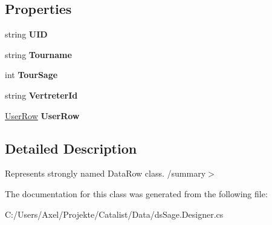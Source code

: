 \subsection*{Properties}
\begin{DoxyCompactItemize}
\item 
string {\bfseries U\+ID}\hypertarget{class_products_1_1_data_1_1ds_sage_1_1_tour_row_a6363547e68f9578c52e06407d3631ed5}{}\label{class_products_1_1_data_1_1ds_sage_1_1_tour_row_a6363547e68f9578c52e06407d3631ed5}

\item 
string {\bfseries Tourname}\hypertarget{class_products_1_1_data_1_1ds_sage_1_1_tour_row_ad7a9c410ced71e289d42a5100bcf97d9}{}\label{class_products_1_1_data_1_1ds_sage_1_1_tour_row_ad7a9c410ced71e289d42a5100bcf97d9}

\item 
int {\bfseries Tour\+Sage}\hypertarget{class_products_1_1_data_1_1ds_sage_1_1_tour_row_afa65a81f5f7e4ab02d29b8e9224d4b9c}{}\label{class_products_1_1_data_1_1ds_sage_1_1_tour_row_afa65a81f5f7e4ab02d29b8e9224d4b9c}

\item 
string {\bfseries Vertreter\+Id}\hypertarget{class_products_1_1_data_1_1ds_sage_1_1_tour_row_adeaeb0308801dce3eacfb195d7478bc7}{}\label{class_products_1_1_data_1_1ds_sage_1_1_tour_row_adeaeb0308801dce3eacfb195d7478bc7}

\item 
\hyperlink{class_products_1_1_data_1_1ds_sage_1_1_user_row}{User\+Row} {\bfseries User\+Row}\hypertarget{class_products_1_1_data_1_1ds_sage_1_1_tour_row_a691a8cb0b3bf2219ab014bbd92ac619b}{}\label{class_products_1_1_data_1_1ds_sage_1_1_tour_row_a691a8cb0b3bf2219ab014bbd92ac619b}

\end{DoxyCompactItemize}


\subsection{Detailed Description}
Represents strongly named Data\+Row class. /summary$>$ 

The documentation for this class was generated from the following file\+:\begin{DoxyCompactItemize}
\item 
C\+:/\+Users/\+Axel/\+Projekte/\+Catalist/\+Data/ds\+Sage.\+Designer.\+cs\end{DoxyCompactItemize}
